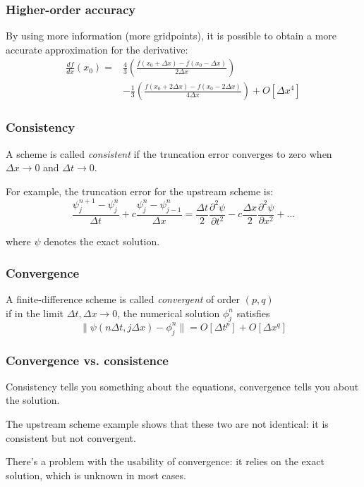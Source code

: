 \documentclass[aspectratio=43,9pt]{beamer}
\begin{document}
%
%
\begin{frame}
	\frametitle{Higher-order accuracy}
	By using more information (more gridpoints), it is possible to obtain a more accurate approximation for the derivative:\vspace*{3ex}
	\begin{align*}
		\frac{df}{dx} (x_0) = &
		\frac43 \left(
			\frac{f(x_0 + \Delta x) - f(x_0 - \Delta x)}{2 \Delta x}
		\right)\\
		&-\frac13 \left(
			\frac{f(x_0 + 2\Delta x) - f(x_0 - 2 \Delta x)}{4 \Delta x}
		\right)
		+ O[\Delta x^4 ]
	\end{align*}
\end{frame}
%
%
\begin{frame}
	\frametitle{Consistency}
	A scheme is called \emph{consistent} if the truncation error converges to zero when $\Delta x \rightarrow 0$ and $\Delta t \rightarrow 0$.
	\par\vspace*{3ex}
	For example, the truncation error for the upstream scheme is:\vspace*{2ex}
	\begin{equation*}
		\frac{\psi_j^{n+1} - \psi_j^n}{\Delta t}
		+ c \frac{\psi_j^n - \psi_{j-1}^n}{\Delta x} = 
		\frac{\Delta t}{2} \frac{\partial^2 \psi}{\partial t^2}
		- c \frac{\Delta x}{2} \frac{\partial^2 \psi}{\partial x^2} + \dots
	\end{equation*}\par\vspace*{2ex}
	where $\psi$ denotes the exact solution.
\end{frame}
%
%
\begin{frame}
	\frametitle{Convergence}
	A finite-difference scheme is called \emph{convergent} of order $(p,q)$\\ if in the limit $\Delta t, \Delta x \rightarrow 0$, the numerical solution $\phi_j^n$ satisfies\vspace*{4ex}
	\begin{equation*}
	\| \psi (n \Delta t, j \Delta x ) - \phi_j^n \| = O [ \Delta t^p ] + O [ \Delta x^q ]
	\end{equation*}
\end{frame}
%
%
\begin{frame}
	\frametitle{Convergence vs. consistence}
	Consistency tells you something about the equations, convergence tells you about the solution.
	\par\vspace*{3ex}
	The upstream scheme example shows that these two are not identical: it is consistent but not convergent.
	\par\vspace*{3ex}
	There's a problem with the usability of convergence: it relies on the exact solution, which is unknown in most cases.
\end{frame}
\end{document}
